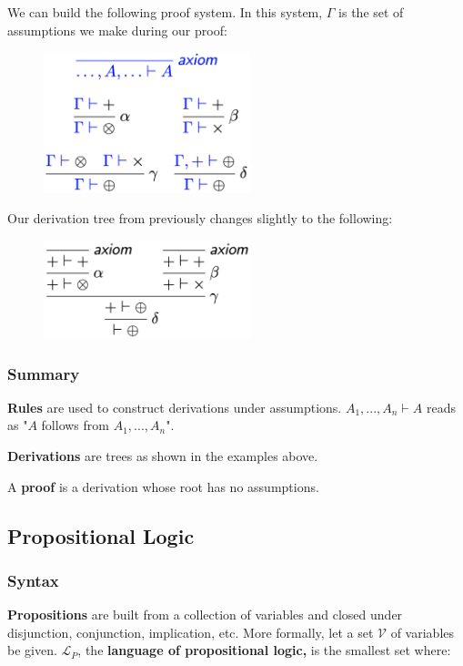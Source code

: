\documentclass[a4paper]{extarticle}
\begin{document}
We can build the following proof system. In this system, \(\Gamma\) is the set of assumptions we make during our proof:

\begin{figure}[H]
    \includegraphics[width=6cm]{../images/FMFP_Fig1-3}
    \centering
\end{figure}

Our derivation tree from previously changes slightly to the following:

\begin{figure}[H]
    \includegraphics[width=6cm]{../images/FMFP_Fig1-4}
    \centering
\end{figure}

\subsubsection{Summary}

\textbf{Rules} are used to construct derivations under assumptions. \(A_1,...,A_n \vdash A\) reads as "\(A\) follows from \(A_1,...,A_n\)".

\textbf{Derivations} are trees as shown in the examples above.

A \textbf{proof} is a derivation whose root has no assumptions.

\subsection{Propositional Logic}

\subsubsection{Syntax}

\textbf{Propositions} are built from a collection of variables and closed under disjunction, conjunction, implication, etc. More formally, let a set \(\mathcal{V}\) of variables be given. \(\mathcal{L}_P\), the \textbf{language of propositional logic,} is the smallest set where:
\end{document}
